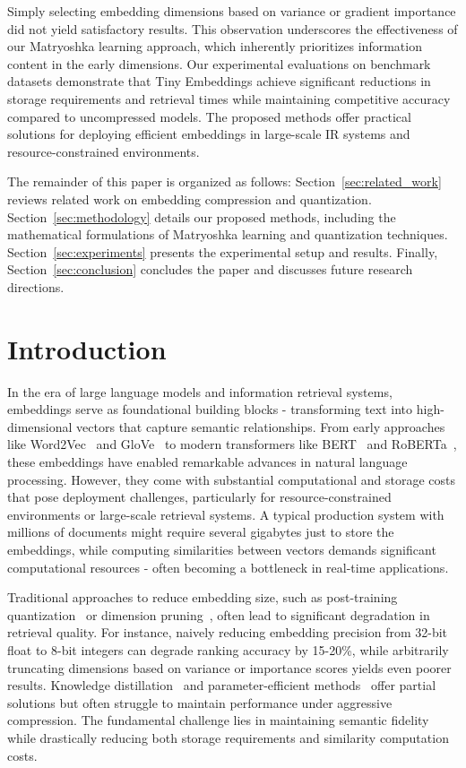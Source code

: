 Simply selecting embedding dimensions based on variance or gradient importance did not yield satisfactory results. This observation underscores the effectiveness of our Matryoshka learning approach, which inherently prioritizes information content in the early dimensions.  
Our experimental evaluations on benchmark datasets demonstrate that Tiny Embeddings achieve significant reductions in storage requirements and retrieval times while maintaining competitive accuracy compared to uncompressed models. The proposed methods offer practical solutions for deploying efficient embeddings in large-scale IR systems and resource-constrained environments.  
  
The remainder of this paper is organized as follows: Section~\ref{sec:related_work} reviews related work on embedding compression and quantization. Section~\ref{sec:methodology} details our proposed methods, including the mathematical formulations of Matryoshka learning and quantization techniques. Section~\ref{sec:experiments} presents the experimental setup and results. Finally, Section~\ref{sec:conclusion} concludes the paper and discusses future research directions.  


\section{Introduction}

In the era of large language models and information retrieval systems, embeddings serve as foundational building blocks - transforming text into high-dimensional vectors that capture semantic relationships. From early approaches like Word2Vec~\cite{mikolov2013distributed} and GloVe~\cite{pennington2014glove} to modern transformers like BERT~\cite{devlin2019bert} and RoBERTa~\cite{liu2019roberta}, these embeddings have enabled remarkable advances in natural language processing. However, they come with substantial computational and storage costs that pose deployment challenges, particularly for resource-constrained environments or large-scale retrieval systems. A typical production system with millions of documents might require several gigabytes just to store the embeddings, while computing similarities between vectors demands significant computational resources - often becoming a bottleneck in real-time applications.

Traditional approaches to reduce embedding size, such as post-training quantization~\cite{jacob2018quantization} or dimension pruning~\cite{li2016pruning}, often lead to significant degradation in retrieval quality. For instance, naively reducing embedding precision from 32-bit float to 8-bit integers can degrade ranking accuracy by 15-20\%, while arbitrarily truncating dimensions based on variance or importance scores yields even poorer results. Knowledge distillation~\cite{hinton2015distilling} and parameter-efficient methods~\cite{houlsby2019parameter} offer partial solutions but often struggle to maintain performance under aggressive compression. The fundamental challenge lies in maintaining semantic fidelity while drastically reducing both storage requirements and similarity computation costs.

